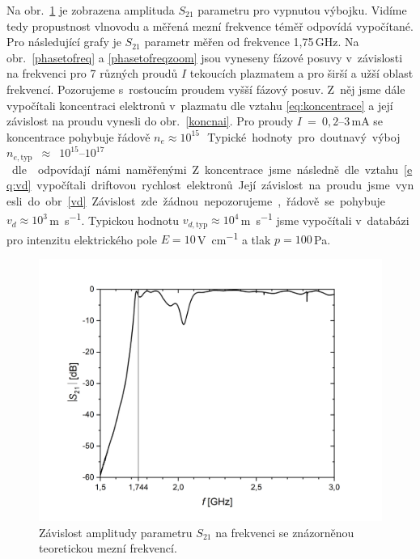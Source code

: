 \documentclass[a4paper,12pt]{article}
\begin{document}
Na obr.~\ref{S21vyp} je zobrazena 
amplituda $S_{21}$ parametru pro vypnutou výbojku. Vidíme tedy propustnost 
vlnovodu a měřená mezní frekvence téměř odpovídá vypočítané. Pro následující 
grafy je $S_{21}$ parametr měřen od frekvence 1,75\,\si{\giga\hertz}. Na 
obr.~\ref{phasetofreq} a \ref{phasetofreqzoom} jsou vyneseny fázové posuvy
v~závislosti na frekvenci pro 7 různých proudů $I$ tekoucích plazmatem a pro 
širší a užší oblast frekvencí. Pozorujeme s~rostoucím proudem vyšší fázový 
posuv. Z~něj jsme dále vypočítali koncentraci elektronů v~plazmatu dle vztahu 
\eqref{eq:koncentrace} a její závislost na proudu vynesli do 
obr.~\ref{koncnai}. Pro proudy $I$~=~$0,2$--$3$\,\si{\milli\ampere} se 
koncentrace 
pohybuje řádově $n_e \approx 10^{15}$\,\si{\cubic\per\meter}. 
Typické 
hodnoty pro doutnavý výboj
$n_{e,\text{typ}}$~$\approx$~$10^{15}$--$10^{17}$\,\si{\cubic\per\meter} dle
\cite{conc} odpovídají námi naměřenými. Z~koncentrace jsme následně dle vztahu 
\eqref{eq:vd} vypočítali driftovou rychlost elektronů. Její závislost na proudu 
jsme vynesli do obr.~\ref{vd}. Závislost zde žádnou nepozorujeme, řádově se 
pohybuje $v_d \approx 10^3$\,\si{\meter\per\second}. Typickou hodnotu 
$v_{d,\text{typ}} \approx 10^4$\,\si{\meter\per\second} jsme vypočítali 
v~databázi \cite{lxcat} pro intenzitu elektrického pole $E = 
10$\,\si{\volt\per\centi\meter} a tlak $p = 100$\,\si{\pascal}.


\begin{figure}[h]
	\centering
	\includegraphics[width=0.9\linewidth]{S21vyp.png}
	\caption{Závislost amplitudy parametru $S_{21}$ na frekvenci se znázorněnou 
	teoretickou mezní frekvencí.}
	\label{S21vyp}
\end{figure}
\end{document}
